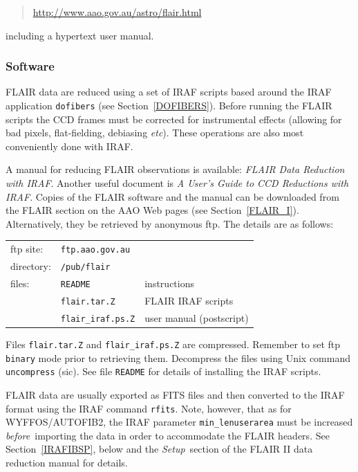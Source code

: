 \documentclass[twoside,11pt]{starlink}
\begin{document}
\begin{quote}
\url{http://www.aao.gov.au/astro/flair.html}
\end{quote}

including a hypertext user manual.

\subsubsection{\label{FLAIR_S}Software}

FLAIR data are reduced using a set of IRAF scripts based
around the IRAF application \texttt{dofibers} (see Section~\ref{DOFIBERS}).
Before running the FLAIR scripts the CCD frames must be corrected for
instrumental effects (allowing for bad pixels, flat-fielding, debiasing
\emph{etc}).  These operations are also most conveniently done with IRAF.

A manual for reducing FLAIR observations is available: \textit{FLAIR Data
Reduction with IRAF}\/\cite{DRINK96}.  Another useful document is \textit{A
User's Guide to CCD Reductions with IRAF}\/\cite{MASSEY92}.  Copies of the
FLAIR software and the manual can be downloaded from the FLAIR section on
the AAO Web pages (see Section~\ref{FLAIR_I}).  Alternatively, they be
retrieved by anonymous ftp.  The details are as follows:

\begin{tabular}{lll}
ftp site:  & \texttt{ftp.aao.gov.au}   & \\
directory: & \texttt{/pub/flair}       & \\
files:     & \texttt{README}           & instructions             \\
           & \texttt{flair.tar.Z}      & FLAIR IRAF scripts       \\
           & \texttt{flair\_iraf.ps.Z} & user manual (postscript) \\
\end{tabular}

Files \texttt{flair.tar.Z} and \texttt{flair\_iraf.ps.Z} are compressed.
Remember to set ftp \texttt{binary} mode prior to retrieving them.
Decompress the files using Unix command \texttt{uncompress} (sic).  See
file \texttt{README} for details of installing the IRAF scripts.

FLAIR data are usually exported as FITS files and then converted to
the IRAF format using the IRAF command \texttt{rfits}.  Note, however,
that as for WYFFOS/AUTOFIB2, the IRAF parameter \texttt{min\_lenuserarea}
must be increased \textit{before}\, importing the data in order to
accommodate the FLAIR headers.  See Section~\ref{IRAFIBSP}, below and the
\textit{Setup}\, section of the FLAIR II data reduction manual for details.
\end{document}
